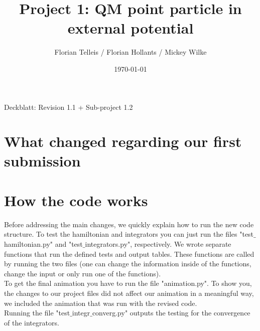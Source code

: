\documentclass[11pt, letterpaper, onecolumn]{article}
\title{Project 1: QM point particle in external potential}
\author{Florian Telleis / Florian Hollants / Mickey Wilke}
\date{\today}
\begin{document}
	
		Deckblatt: Revision 1.1 + Sub-project 1.2 
		
		\newpage
	
	
	
	
	
	
	\tableofcontents
	
	
	
	
	
	\vspace{0.5cm}
	
	
	\section{What changed regarding our first submission}
	
	\section{How the code works}
	Before addressing the main changes, we quickly explain how to run the new code structure. To test the hamiltonian and integrators you can just run the files "test$\_$hamiltonian.py" and "test$\_$integrators.py", respectively. We wrote separate functions that run the defined tests and output tables. These functions are called by running the two files (one can change the information inside of the functions, change the input or only run one of the functions).\\
	To get the final animation you have to run the file "animation.py". To show you, the changes to our project files did not affect our animation in a meaningful way, we included the animation that was run with the revised code. \\ 
	Running the file "test$\_$integr$\_$converg.py" outputs the testing for the convergence of the integrators.
	
	
\end{document}
